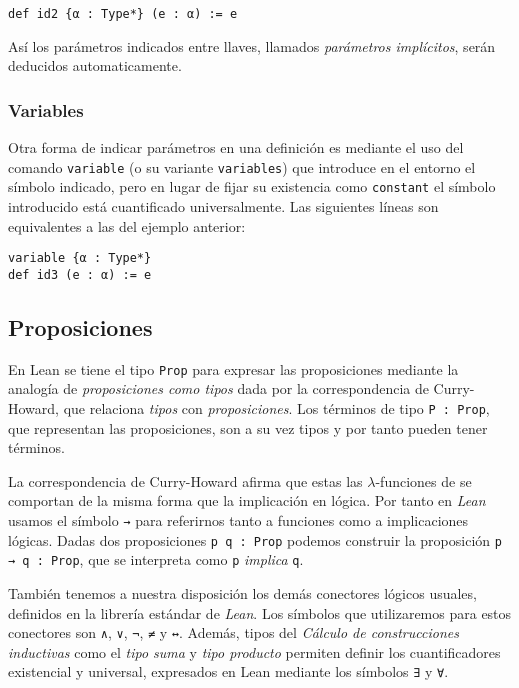 \begin{lstlisting}
def id2 {α : Type*} (e : α) := e
\end{lstlisting}

Así los parámetros indicados entre llaves, llamados \textit{parámetros
	implícitos}, serán deducidos automaticamente.

\subsubsection*{Variables}%

Otra forma de indicar parámetros en una definición es mediante el uso del
comando \lstinline{variable} (o su variante \lstinline{variables}) que introduce
en el entorno el símbolo indicado, pero en lugar de fijar su existencia como
\lstinline{constant} el símbolo introducido está \guillemotleft cuantificado
universalmente\guillemotright. Las siguientes líneas son equivalentes a las del
ejemplo anterior:

\begin{lstlisting}
variable {α : Type*}
def id3 (e : α) := e
\end{lstlisting}

\subsection{Proposiciones}

En Lean se tiene el tipo \lstinline{Prop} para expresar las
proposiciones mediante la analogía de \textit{proposiciones como tipos} dada por
la correspondencia de Curry-Howard, que relaciona \textit{tipos} con
\textit{proposiciones}. Los términos de tipo \lstinline{P : Prop}, que representan las
proposiciones, son a su vez tipos y por tanto pueden tener términos.

La correspondencia de Curry-Howard afirma que estas las $\lambda$-funciones de
se comportan de la misma forma que la implicación en lógica.
Por tanto en \textit{Lean} usamos el símbolo \lstinline{→} para referirnos tanto a
funciones como a implicaciones lógicas. Dadas dos
proposiciones \lstinline{p q : Prop} podemos construir la proposición
\lstinline{p → q : Prop}, que se interpreta como \lstinline{p} \textit{implica}
\lstinline{q}.


También tenemos a nuestra disposición los demás conectores lógicos usuales,
definidos en la librería estándar de \textit{Lean}. Los símbolos que
utilizaremos para estos conectores son \lstinline{∧}, \lstinline{∨},
\lstinline{¬}, \lstinline{≠} y \lstinline{↔}. Además, tipos del \textit{Cálculo
de construcciones inductivas} como el \textit{tipo suma} y \textit{tipo
	producto} permiten definir los cuantificadores existencial y universal,
expresados en Lean mediante los símbolos \lstinline{∃} y \lstinline{∀}.

